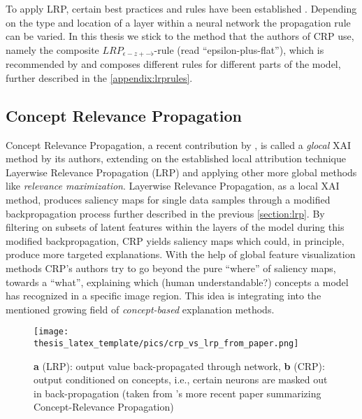 To apply LRP, certain best practices and rules have been established \citep{Kohlbrenner2020, Montavon2019, Samek2021}. Depending on the type and location of a layer within a neural network the propagation rule can be varied. In this thesis we stick to the method that the authors of CRP use, namely the composite $LRP_{\epsilon-z+-\flat}$-rule (read ``epsilon-plus-flat''), which is recommended by \cite{Kohlbrenner2020} and composes different rules for different parts of the model, further described in the \cref{appendix:lrprules}.

\subsection{Concept Relevance Propagation}\label{section:crp_background}
Concept Relevance Propagation, a recent contribution by \cite{Achtibat2022}, is called a \textit{glocal} XAI method by its authors, extending on the established local attribution technique Layerwise Relevance Propagation (LRP) \cite{Bach2015} and applying other more global methods like \textit{relevance maximization}. 
Layerwise Relevance Propagation, as a local XAI method, produces saliency maps for single data samples through a modified backpropagation process further described in the previous \cref{section:lrp}. By filtering on subsets of latent features within the layers of the model during this modified backpropagation, CRP yields saliency maps which could, in principle, produce more targeted explanations. With the help of global feature visualization methods CRP's authors try to go beyond the pure ``where'' of saliency maps, towards a ``what'', explaining which (human understandable?) concepts a model has recognized in a specific image region. This idea is integrating into the mentioned growing field of \textit{concept-based} explanation methods.

\begin{figure}[t!]
    \centering
    \texttt{[image: thesis\_latex\_template/pics/crp\_vs\_lrp\_from\_paper.png]}
    \caption[CRP vs. LRP]{\textbf{a} (LRP): output value back-propagated through network, \textbf{b} (CRP): output conditioned on concepts, i.e., certain neurons are masked out in back-propagation (taken from \cite{Achtibat2023}'s more recent paper summarizing Concept-Relevance Propagation)}
    \label{fig:crp_vs_lrp}
\end{figure}

